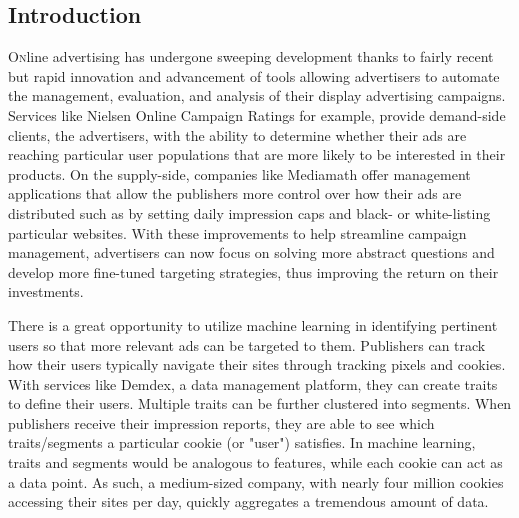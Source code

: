 \documentclass[twoside]{article}
\begin{document}
\begin{multicols}{2} %

\section{Introduction}

\lettrine[nindent=0em,lines=3]{O} nline advertising has undergone sweeping development thanks to fairly recent but rapid innovation and advancement of tools allowing advertisers to automate the management, evaluation, and analysis of their display advertising campaigns. Services like Nielsen Online Campaign Ratings for example, provide demand-side clients, the advertisers, with the ability to determine whether their ads are reaching particular user populations that are more likely to be interested in their products. On the supply-side, companies like Mediamath offer management applications that allow the publishers more control over how their ads are distributed such as by setting daily impression caps and black- or white-listing particular websites. With these improvements to help streamline campaign management, advertisers can now focus on solving more abstract questions and develop more fine-tuned targeting strategies, thus improving the return on their investments\cite{12}.

There is a great opportunity to utilize machine learning in identifying pertinent users so that more relevant ads can be targeted to them. Publishers can track how their users typically navigate their sites through tracking pixels and cookies\cite{13}. With services like Demdex, a data management platform, they can create traits to define their users. Multiple traits can be further clustered into segments. When publishers receive their impression reports, they are able to see which traits/segments a particular cookie (or "user") satisfies. In machine learning, traits and segments would be analogous to features, while each cookie can act as a data point. As such, a medium-sized company, with nearly four million cookies accessing their sites per day, quickly aggregates a tremendous amount of data.


\end{multicols}
\end{document}
